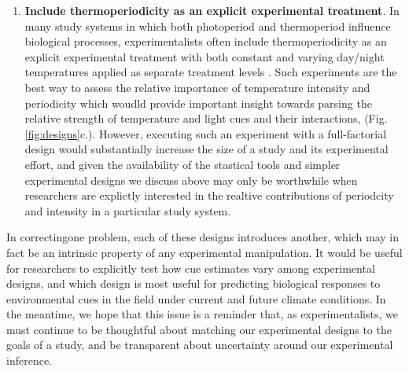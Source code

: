 \documentclass[11pt]{article}
\begin{document}
\begin{enumerate}
\item \textbf{Include thermoperiodicity as an explicit experimental treatment}. 
In many study systems in which both photoperiod and thermoperiod influence biological processes, experimentalists often include thermoperiodicity as an explicit experimental treatment with both constant and varying day/night temperatures applied as separate treatment levels \citep[e.g.,][]{Zaslavksi_1995}. Such experiments are the best way to assess the relative importance of temperature intensity and periodicity which woudld provide important insight towards parsing the relative strength of temperature and light cues and their interactions,  (Fig. \ref{fig:designs}c.). However, executing such an experiment with a full-factorial design would substantially increase the size of a study and its experimental effort, and given the availability of the stastical tools and simpler experimental designs we discuss above may only be worthwhile when researchers are explictly interested in the realtive contributions of periodcity and intensity in a particular study system.
\end{enumerate}

In correctingone problem, each of these designs introduces another, which may in fact be an intrinsic property of any experimental manipulation.%
It would be useful for researchers to explicitly test how cue estimates vary among experimental designs, and which design is most useful for predicting biological responses to environmental cues in the field under current and future climate conditions. In the meantime, we hope that this issue is a reminder that, as experimentalists, we must continue to be thoughtful about matching our experimental designs to the goals of a study, and be transparent about uncertainty around our experimental inference.


\end{document}
